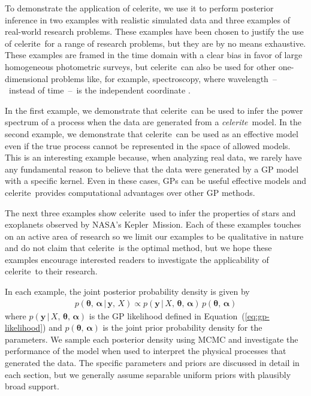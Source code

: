 \documentclass[manuscript, letterpaper]{aastex6}
\newcommand{\project}[1]{\textsf{#1}}
\newcommand{\kepler}{\project{Kepler}}
\newcommand{\celerite}{\project{celerite}}
\newcommand{\celeriteterm}{\emph{celerite}}
\renewcommand{\eqref}[1]{\ref{eq:#1}}
\newcommand{\Eq}[1]{Equation~(\eqref{#1})}
\newcommand{\eq}[1]{\Eq{#1}}
\newcommand{\eqlabel}[1]{\label{eq:#1}}
\newcommand{\bvec}[1]{{\ensuremath{\boldsymbol{#1}}}}
\newcommand{\response}[1]{{\color{blue}#1}}
\begin{document}
\response{
To demonstrate the application of \celerite, we use it to perform posterior
inference in two examples with realistic simulated data and three examples of
real-world research problems.
These examples have been chosen to justify the use of \celerite\ for a range
of research problems, but they are by no means exhaustive.
These examples are framed in the time domain with a clear bias in favor of
large homogeneous photometric surveys, but \celerite\ can also be used for
other one-dimensional problems like, for example, spectroscopy, where
wavelength~--~instead of time~--~is the independent coordinate \citep[see][for
a potential application]{Czekala:2017}.

In the first example, we demonstrate that \celerite\ can be used to infer
the power spectrum of a process when the data are generated from a
\celeriteterm\ model.
In the second example, we demonstrate that \celerite\ can be used as an
effective model even if the true process cannot be represented in the space of
allowed models.
This is an interesting example because, when analyzing real data, we rarely
have any fundamental reason to believe that the data were generated by a GP
model with a specific kernel.
Even in these cases, GPs can be useful effective models and \celerite\
provides computational advantages over other GP methods.

The next three examples show \celerite\ used to infer the properties of stars
and exoplanets observed by NASA's \kepler\ Mission.
Each of these examples touches on an active area of research so we limit our
examples to be qualitative in nature and do not claim that \celerite\ is the
optimal method, but we hope these examples encourage interested readers to
investigate the applicability of \celerite\ to their research.

In each example, the joint posterior probability density is given by
\begin{eqnarray}\eqlabel{joint-post}
p(\bvec{\theta},\,\bvec{\alpha}\,|\,\bvec{y},\,X) \propto
p(\bvec{y}\,|\,{X,\,\bvec{\theta}},\,\bvec{\alpha})\,
p(\bvec{\theta},\,\bvec{\alpha})
\end{eqnarray}
where $p(\bvec{y}\,|\,{X,\,\bvec{\theta}},\,\bvec{\alpha})$ is the GP
likelihood defined in \eq{gp-likelihood} and $p(\bvec{\theta},\,\bvec{\alpha})$
is the joint prior probability density for the parameters.
We sample each posterior density using MCMC and investigate the performance of
the model when used to interpret the physical processes that generated the
data.
The specific parameters and priors are discussed in detail in each section,
but we generally assume separable uniform priors with plausibly broad support.
}
\end{document}
